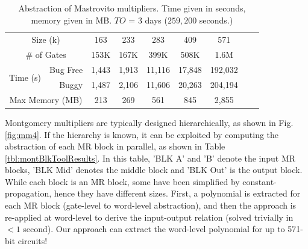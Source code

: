 \setlength{\abovecaptionskip}{3pt}
\begin{table}[hbt]
\begin{center}
{\small
\caption{Abstraction of Mastrovito multipliers. Time given in seconds, memory given in MB. $TO$ = $3$ days ($259,200$ seconds.)}
\label{tbl:mastroToolresults}
\begin{tabular}{|l|r|c|c|c|c|c|c|c|} 
\hline
\multicolumn{2}{|c|}{Size (k)}      &  163  &     233 &     283 &     409 & 571 \\
\multicolumn{2}{|c|}{\# of Gates}   & 153K  &    167K &    399K &    508K & 1.6M \\
\hline
\multirow{2}{*}{Time (s)} & Bug Free &   1,443  &   1,913 &  11,116 & 17,848  & 192,032 \\
                      & Buggy    &   1,487  &   2,106 &  11,606 & 20,263  & 204,194 \\
\hline
\multicolumn{2}{|c|}{Max Memory (MB)} &     213  &     269 &     561 &    845  &   2,855 \\
\hline
\end{tabular}
}
\end{center}
\vspace{-0.15in}
\end{table}

Montgomery multipliers are typically designed hierarchically, as shown in Fig. \ref{fig:mm4}. 
If the hierarchy is known, it can be
exploited by computing the abstraction of each MR block in parallel, as shown in 
Table \ref{tbl:montBlkToolResults}.
In this table, 'BLK A' and 'B' denote the input MR blocks, 'BLK
Mid' denotes the middle block and 'BLK Out' is the output block. While
each block is an MR block, some have been simplified by
constant-propagation, hence they have
different sizes. First, a polynomial is extracted for each MR block
(gate-level to word-level abstraction), and then the approach is
re-applied at word-level to derive the input-output relation (solved
trivially in $< 1$ second). Our approach can extract the word-level
polynomial for up to 571-bit circuits! 

